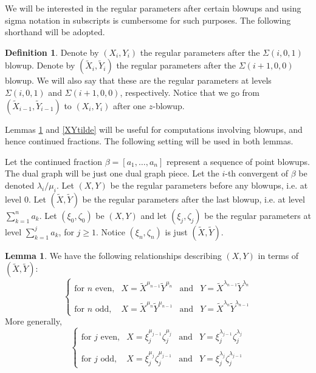 \documentclass[11pt]{amsart}
\theoremstyle{definition}
\newtheorem{lem}[thm]{Lemma}
\newtheorem*{defin}{Definition}
\begin{document}
{We will be interested in the regular parameters after certain blowups and using sigma notation in subscripts is cumbersome for such purposes. The following shorthand will be adopted.

\begin{defin}
Denote by $\left(X_i,Y_i\right)$ the regular parameters after the \mbox{$\Sigma(i,0,1)$} blowup. Denote by $\left(\tilde X_i,\tilde Y_i\right)$ the regular parameters after the \mbox{$\Sigma(i+1,0,0)$} blowup. We will also say that these are the regular parameters at levels \mbox{$\Sigma(i,0,1)$} and \mbox{$\Sigma(i+1,0,0)$}, respectively. Notice that we go from $\left(\tilde X_{i-1},\tilde Y_{i-1}\right)$ to $(X_i,Y_i)$ after one $z$-blowup.
\end{defin}

Lemmas \ref{XY} and \ref{XYtilde} will be useful for computations involving blowups, and hence continued fractions. The following setting will be used in both lemmas.

Let the continued fraction $\beta=[a_1,\ldots,a_n]$ represent a sequence of point blowups. The dual graph will be just one dual graph piece. Let the $i$-th convergent of $\beta$ be denoted $\lambda_i / \mu_i$. Let $(X,Y)$ be the regular parameters before any blowups, i.e. at level 0. Let $\left(\tilde X,\tilde Y\right)$ be the regular parameters after the last blowup, i.e. at level $\sum_{k=1}^n a_k$. Let $(\xi_0,\zeta_0)$ be $(X,Y)$ and let $(\xi_j,\zeta_j)$ be the regular parameters at level $\sum_{k=1}^j a_k$, for  $j\geq 1$. Notice $(\xi_{n},\zeta_{n})$ is just $(\tilde X,\tilde Y)$.

\begin{lem} \label{XY}
We have the following relationships describing $\left(X,Y\right)$ in terms of $\left(\tilde X,\tilde Y\right)$:
\begin{equation*}
\left\{
\begin{array}{llll}
\text{for } n \text{ even,} & X = \tilde X^{\mu_{n-1}} \tilde Y^{\mu_n}  & \text{and} & Y = \tilde X^{\lambda_{n-1}} \tilde Y^{\lambda_n}
\\\\
\text{for } n \text{ odd,} & X = \tilde X^{\mu_n} \tilde Y^{\mu_{n-1}}  & \text{and} & Y= \tilde X^{\lambda_n} \tilde Y^{\lambda_{n-1}}
\end{array}
\right.
\end{equation*}
More generally,
\begin{equation*}
\left\{
\begin{array}{llll}
\text{for } j \text{ even,} & X = \xi_j^{\mu_{j-1}} \zeta_j^{\mu_j}  & \text{and} & Y = \xi_j^{\lambda_{j-1}} \zeta_j^{\lambda_j}
\\\\
\text{for } j \text{ odd,} & X = \xi_j^{\mu_j} \zeta_j^{\mu_{j-1}}  & \text{and} & Y= \xi_j^{\lambda_j} \zeta_j^{\lambda_{j-1}}
\end{array}
\right.
\end{equation*}
\end{lem}

}
\end{document}
